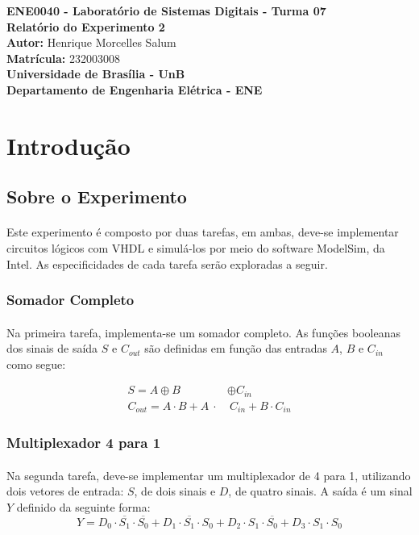 \documentclass[a4paper,12pt]{article}
\newcommand{\capa}{
    \begin{titlepage}
        \begin{center}
            {\large \textbf{ENE0040 - Laboratório de Sistemas Digitais - Turma 07}} \\
            \vspace{3cm}
            {\Huge \textbf{Relatório do Experimento 2}} \\[1em]
            {\large \textbf{Autor:} Henrique Morcelles Salum} \\[0.5em]
            {\large \textbf{Matrícula:} 232003008} \\
            \vfill
            {\Large \textbf{Universidade de Brasília - UnB}} \\[0.75em]
            {\large \textbf{Departamento de Engenharia Elétrica - ENE}} \\
        \end{center}
    \end{titlepage}
}
\begin{document}
\capa

\newpage
\tableofcontents
\newpage

\section{Introdução}

\subsection{Sobre o Experimento}
\label{subsec:sobre_o_experimento}
\paragraph{}
Este experimento é composto por duas tarefas, em ambas, deve-se implementar circuitos lógicos com VHDL e simulá-los por meio do software ModelSim, da Intel. As especificidades de cada tarefa serão exploradas a seguir.

\subsubsection{Somador Completo}
\paragraph{}
Na primeira tarefa, implementa-se um somador completo. As funções booleanas dos sinais de saída $S$ e $C_{out}$ são definidas em função das entradas $A$, $B$ e $C_{in}$ como segue:

\begin{align*}
S = A \oplus B& \oplus C_{in} \\
C_{out} = A \cdot B + A \ \cdot& \ C_{in} + B \cdot C_{in}
\end{align*}

\subsubsection{Multiplexador 4 para 1}
\paragraph{}
Na segunda tarefa, deve-se implementar um multiplexador de 4 para 1, utilizando dois vetores de entrada: $S$, de dois sinais e $D$, de quatro sinais. A saída é um sinal $Y$ definido da seguinte forma:
\[
Y = D_0 \cdot \overline{S_1} \cdot \overline{S_0} + D_1 \cdot \overline{S_1} \cdot S_0 + D_2 \cdot S_1 \cdot \overline{S_0} + D_3 \cdot S_1 \cdot S_0
\]
\end{document}
